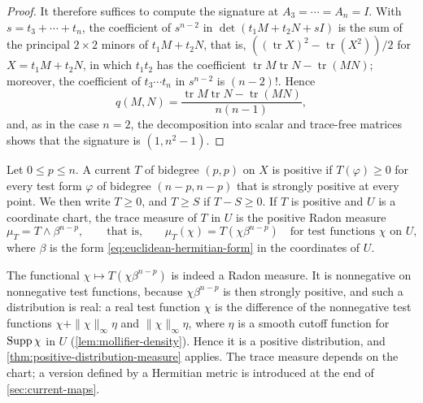 \begin{proof}
It therefore suffices to compute the signature at $A_3=\cdots=A_n=I$. With $s=t_3+\cdots+t_n$, the coefficient of $s^{n-2}$ in $\det(t_1M+t_2N+sI)$ is the sum of the principal $2\times2$ minors of $t_1M+t_2N$, that is, $((\operatorname{tr}X)^2-\operatorname{tr}(X^2))/2$ for $X=t_1M+t_2N$, in which $t_1t_2$ has the coefficient $\operatorname{tr}M\operatorname{tr}N-\operatorname{tr}(MN)$; moreover, the coefficient of $t_3\cdots t_n$ in $s^{n-2}$ is $(n-2)!$. Hence
\[
 q(M,N)=\frac{\operatorname{tr}M\operatorname{tr}N-\operatorname{tr}(MN)}{n(n-1)},
\]
and, as in the case $n=2$, the decomposition into scalar and trace-free matrices shows that the signature is $(1,n^2-1)$.
\end{proof}

\begin{definition}\label{def:positive-current}
Let $0\leq p\leq n$. A current $T$ of bidegree $(p,p)$ on $X$ is positive if $T(\varphi)\ge0$ for every test form $\varphi$ of bidegree $(n-p,n-p)$ that is strongly positive at every point. We then write $T\geq0$, and $T\geq S$ if $T-S\geq0$. If $T$ is positive and $U$ is a coordinate chart, the trace measure of $T$ in $U$ is the positive Radon measure
\[
 \mu_T=T\wedge\beta^{n-p},\qquad\text{that is,}\qquad \mu_T(\chi)=T(\chi\beta^{n-p})\quad\text{for test functions }\chi\text{ on }U,
\]
where $\beta$ is the form \eqref{eq:euclidean-hermitian-form} in the coordinates of $U$.
\end{definition}
The functional $\chi\mapsto T(\chi\beta^{n-p})$ is indeed a Radon measure. It is nonnegative on nonnegative test functions, because $\chi\beta^{n-p}$ is then strongly positive, and such a distribution is real: a real test function $\chi$ is the difference of the nonnegative test functions $\chi+\|\chi\|_\infty\eta$ and $\|\chi\|_\infty\eta$, where $\eta$ is a smooth cutoff function for $\operatorname{Supp}\chi$ in $U$ (\cref{lem:mollifier-density}). Hence it is a positive distribution, and \cref{thm:positive-distribution-measure} applies. The trace measure depends on the chart; a version defined by a Hermitian metric is introduced at the end of \cref{sec:current-maps}.

